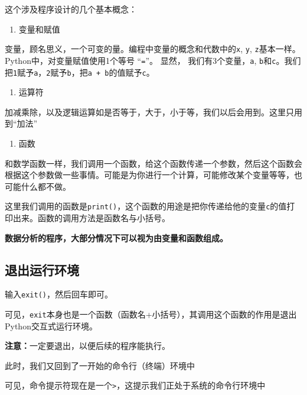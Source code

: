 \documentclass[
]{book}
\providecommand{\tightlist}{%
  \setlength{\itemsep}{0pt}\setlength{\parskip}{0pt}}
\begin{document}
这个涉及程序设计的几个基本概念：

\begin{enumerate}
\def\labelenumi{\arabic{enumi}.}
\tightlist
\item
  变量和赋值
\end{enumerate}

变量，顾名思义，一个可变的量。编程中变量的概念和代数中的\texttt{x}, \texttt{y}, \texttt{z}基本一样。
Python中，对变量赋值使用1个等号 ``\texttt{=}''。
显然， 我们有3个变量，\texttt{a}, \texttt{b}和\texttt{c}。我们把\texttt{1}赋予\texttt{a}，\texttt{2}赋予\texttt{b}，把\texttt{a\ +\ b}的值赋予\texttt{c}。

\begin{enumerate}
\def\labelenumi{\arabic{enumi}.}
\setcounter{enumi}{1}
\tightlist
\item
  运算符
\end{enumerate}

加减乘除，以及逻辑运算如是否等于，大于，小于等，我们以后会用到。这里只用到``加法''

\begin{enumerate}
\def\labelenumi{\arabic{enumi}.}
\setcounter{enumi}{2}
\tightlist
\item
  函数
\end{enumerate}

和数学函数一样，我们调用一个函数，给这个函数传递一个参数，然后这个函数会根据这个参数做一些事情。可能是为你进行一个计算，可能修改某个变量等等，也可能什么都不做。

这里我们调用的函数是\texttt{print()}，这个函数的用途是把你传递给他的变量\texttt{c}的值打印出来。函数的调用方法是函数名与小括号。

\textbf{数据分析的程序，大部分情况下可以视为由变量和函数组成。}

\hypertarget{ux9000ux51faux8fd0ux884cux73afux5883}{%
\subsection{退出运行环境}\label{ux9000ux51faux8fd0ux884cux73afux5883}}

输入\texttt{exit()}，然后回车即可。

可见，\texttt{exit}本身也是一个函数（函数名+小括号），其调用这个函数的作用是退出Python交互式运行环境。

{\textbf{注意：}}一定要退出，以便后续的程序能执行。

此时，我们又回到了一开始的命令行（终端）环境中

可见，命令提示符现在是一个\texttt{\textgreater{}}，这提示我们正处于系统的命令行环境中
\end{document}

